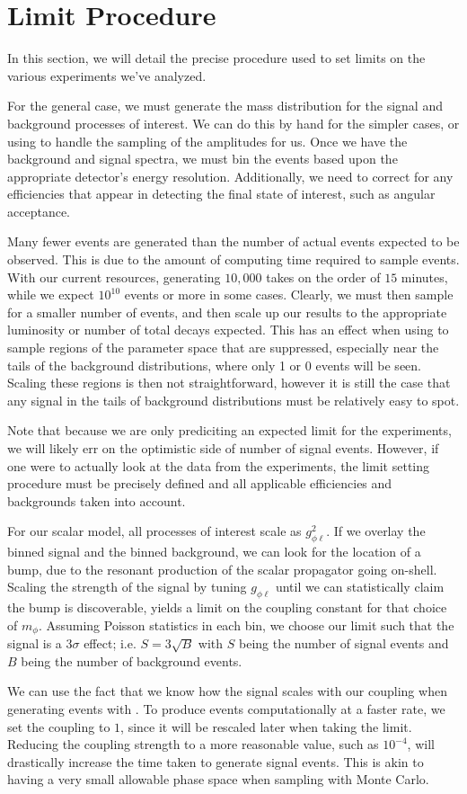 \section{Limit Procedure}
In this section, we will detail the precise procedure used to set limits on the various experiments we've analyzed.

For the general case, we must generate the mass distribution for the signal and background processes of interest.
We can do this by hand for the simpler cases, or using \madgraph to handle the sampling of the amplitudes for us.
Once we have the background and signal spectra, we must bin the events based upon the appropriate detector's energy resolution.
Additionally, we need to correct for any efficiencies that appear in detecting the final state of interest, such as angular acceptance.

Many fewer events are generated than the number of actual events expected to be observed.
This is due to the amount of computing time required to sample events.
With our current resources, generating $10,000$ takes on the order of $15$ minutes, while we expect $10^{10}$ events or more in some cases.
Clearly, we must then sample for a smaller number of events, and then scale up our results to the appropriate luminosity or number of total decays expected.
This has an effect when using \madgraph to sample regions of the parameter space that are suppressed, especially near the tails of the background distributions, where only 1 or 0 events will be seen.
Scaling these regions is then not straightforward, however it is still the case that any signal in the tails of background distributions must be relatively easy to spot.

Note that because we are only prediciting an expected limit for the experiments, we will likely err on the optimistic side of number of signal events.
However, if one were to actually look at the data from the experiments, the limit setting procedure must be precisely defined and all applicable efficiencies and backgrounds taken into account.

For our scalar model, all processes of interest scale as $g_{\phi\ell}^2$.
If we overlay the binned signal and the binned background, we can look for the location of a bump, due to the resonant production of the scalar propagator going on-shell.
Scaling the strength of the signal by tuning $g_{\phi\ell}$ until we can statistically claim the bump is discoverable, yields a limit on the coupling constant for that choice of $m_\phi$.
Assuming Poisson statistics in each bin, we choose our limit such that the signal is a $3\sigma$ effect; i.e. $S = 3\sqrt{B}$ with $S$ being the number of signal events and $B$ being the number of background events.

We can use the fact that we know how the signal scales with our coupling when generating events with \madgraph.
To produce events computationally at a faster rate, we set the coupling to $1$, since it will be rescaled later when taking the limit.
Reducing the coupling strength to a more reasonable value, such as $10^{-4}$, will drastically increase the time taken to generate signal events.
This is akin to having a very small allowable phase space when sampling with Monte Carlo.
